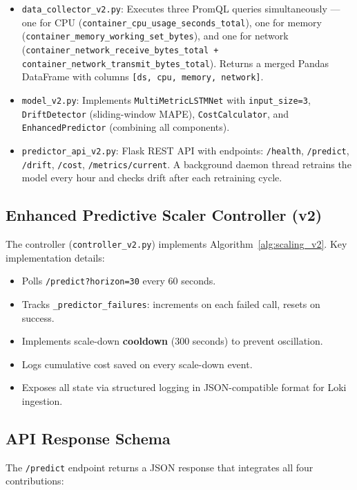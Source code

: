 \documentclass[journal]{IEEEtran}
\begin{document}
\begin{itemize}
    \item \texttt{data\_collector\_v2.py}: Executes three PromQL queries simultaneously --- one for CPU (\texttt{container\_cpu\_usage\_seconds\_total}), one for memory (\texttt{container\_memory\_working\_set\_bytes}), and one for network (\texttt{container\_network\_receive\_bytes\_total + container\_network\_transmit\_bytes\_total}). Returns a merged Pandas DataFrame with columns \texttt{[ds, cpu, memory, network]}.
    \item \texttt{model\_v2.py}: Implements \texttt{MultiMetricLSTMNet} with \texttt{input\_size=3}, \texttt{DriftDetector} (sliding-window MAPE), \texttt{CostCalculator}, and \texttt{EnhancedPredictor} (combining all components).
    \item \texttt{predictor\_api\_v2.py}: Flask REST API with endpoints: \texttt{/health}, \texttt{/predict}, \texttt{/drift}, \texttt{/cost}, \texttt{/metrics/current}. A background daemon thread retrains the model every hour and checks drift after each retraining cycle.
\end{itemize}

\subsection{Enhanced Predictive Scaler Controller (v2)}
The controller (\texttt{controller\_v2.py}) implements Algorithm~\ref{alg:scaling_v2}. Key implementation details:

\begin{itemize}
    \item Polls \texttt{/predict?horizon=30} every 60 seconds.
    \item Tracks \texttt{\_predictor\_failures}: increments on each failed call, resets on success.
    \item Implements scale-down \textbf{cooldown} (300 seconds) to prevent oscillation.
    \item Logs cumulative cost saved on every scale-down event.
    \item Exposes all state via structured logging in JSON-compatible format for Loki ingestion.
\end{itemize}

\subsection{API Response Schema}
The \texttt{/predict} endpoint returns a JSON response that integrates all four contributions:
\end{document}
